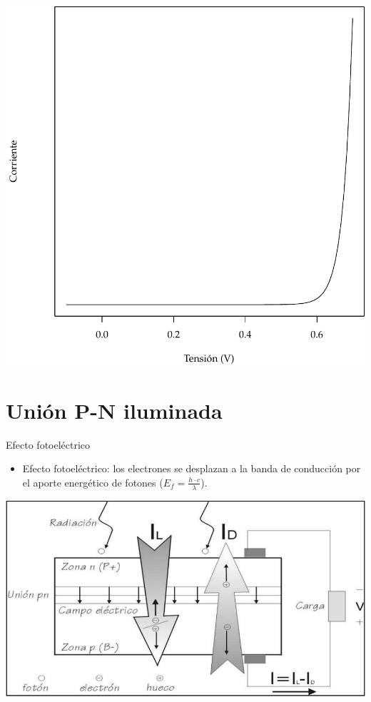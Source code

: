 \documentclass[xcolor={usenames,svgnames,dvipsnames}]{beamer}
\begin{document}
\begin{frame}[label={sec:org5ae4f51}]{}
\begin{center}
\includegraphics[width=.9\linewidth]{../figs/EcuacionDiodo.pdf}
\end{center}
\end{frame}


\section{Unión P-N iluminada}
\label{sec:orga8aa05e}

\begin{frame}[label={sec:org8c54bc2}]{Efecto fotoeléctrico}
\begin{itemize}
\item Efecto fotoeléctrico: \alert{los electrones se desplazan a la banda de conducción por el aporte energético de fotones} (\(E_{f}=\frac{h\cdot c}{\lambda}\)).
\end{itemize}


\begin{center}
\includegraphics[width=.9\linewidth]{../figs/CelulaSolar.pdf}
\end{center}
\end{frame}
\end{document}
